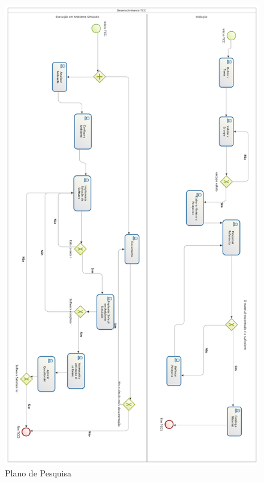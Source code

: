 \graphicspath{{figuras/}}
\begin{figure}
\centering
\includegraphics[scale=0.60]{TCCMetodologia.png}
\caption{Plano de Pesquisa}
\label{Rotulo}
\end{figure}

